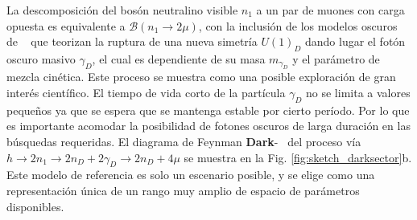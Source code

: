 La descomposición del bosón neutralino visible $n_1$ a un par de muones con carga opuesta es equivalente a $\mathcal{B}(n_1 \rightarrow 2\mu)$, con la inclusión de los modelos oscuros de \SUSY ~ que teorizan la ruptura de una nueva simetría $U(1)_D$ dando lugar el fotón oscuro masivo $\gamma_D$, el cual es dependiente de su masa $m_{\gamma_D}$ y el parámetro de mezcla cinética. Este proceso se muestra como una posible exploración de gran interés científico. El tiempo de vida corto de la partícula $\gamma_D$ no se limita a valores pequeños ya que se espera que se mantenga estable por cierto período. Por lo que es importante acomodar la posibilidad de fotones oscuros de larga duración en las búsquedas requeridas. El diagrama de Feynman \textbf{Dark}-\SUSY ~ del proceso vía $h \rightarrow 2n_1 \rightarrow 2n_D + 2\gamma_D \rightarrow 2n_D + 4\mu$ se muestra en la Fig. \ref{fig:sketch_darksector}b. Este modelo de referencia es solo un escenario posible, y se elige como una representación única de un rango muy amplio de espacio de parámetros disponibles. %






























